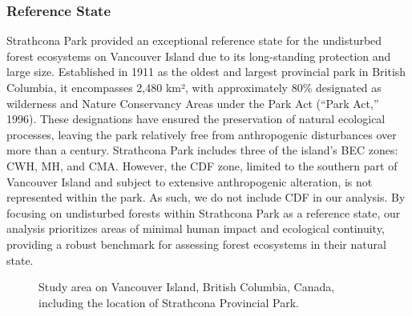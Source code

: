 \documentclass[
]{agujournal2019}
\begin{document}
\subsubsection{Reference State}\label{reference-state}

Strathcona Park provided an exceptional reference state for the
undisturbed forest ecosystems on Vancouver Island due to its
long-standing protection and large size. Established in 1911 as the
oldest and largest provincial park in British Columbia, it encompasses
2,480 km², with approximately 80\% designated as wilderness and Nature
Conservancy Areas under the Park Act ({``Park {Act},''} 1996). These
designations have ensured the preservation of natural ecological
processes, leaving the park relatively free from anthropogenic
disturbances over more than a century. Strathcona Park includes three of
the island's BEC zones: CWH, MH, and CMA. However, the CDF zone, limited
to the southern part of Vancouver Island and subject to extensive
anthropogenic alteration, is not represented within the park. As such,
we do not include CDF in our analysis. By focusing on undisturbed
forests within Strathcona Park as a reference state, our analysis
prioritizes areas of minimal human impact and ecological continuity,
providing a robust benchmark for assessing forest ecosystems in their
natural state.

\label{cell-fig-study}
\begin{figure}[H]


\caption{\label{fig-study}Study area on Vancouver Island, British
Columbia, Canada, including the location of Strathcona Provincial Park.}

\end{figure}%
\end{document}
